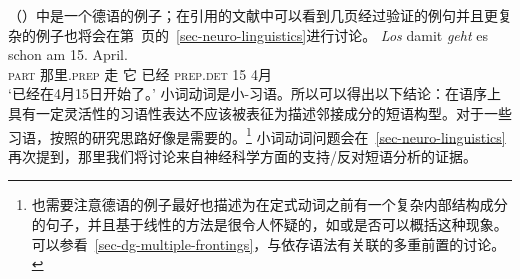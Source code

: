 \begin{exe}
\begin{xlist}[iv.]
\begin{exe}
\begin{xlist}[iv.]
（）中是一个德语的例子；在引用的文献中可以看到几页经过验证的例句并且更复杂的例子也将会在第~\pageref{ex-complex-vf}页的~\ref{sec-neuro-linguistics}进行讨论。
\ea\label{bsp-los-damit-zwei}
\gll \emph{Los} damit \emph{geht} es schon am 15. April.\footnotemark\\
      \textsc{part} 那里.\textsc{prep} 走 它 已经 \textsc{prep}.\textsc{det} 15 4月\\%
%
\glt `已经在4月15日开始了。'
\z
小词动词是小-习语。所以可以得出以下结论：在语序上具有一定灵活性的习语性表达不应该被表征为描述邻接成分的短语构型。对于一些习语，按照的研究思路好像是需要的。\footnote{也需要注意德语的例子最好也描述为在定式动词之前有一个复杂内部结构成分的句子，并且基于线性的方法是很令人怀疑的，如或是否可以概括这种现象。可以参看~\ref{sec-dg-multiple-frontings}，与依存语法有关联的多重前置的讨论。
}
小词动词问题会在~\ref{sec-neuro-linguistics}再次提到，那里我们将讨论来自神经科学方面的支持/反对短语分析的证据。


\end{xlist}
\end{exe}
\end{xlist}
\end{exe}
